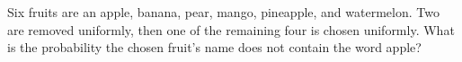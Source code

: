 Six fruits are an apple, banana, pear, mango, pineapple, and watermelon. Two are removed uniformly, then one of the remaining four is chosen uniformly. What is the probability the chosen fruit's name does not contain the word apple?
